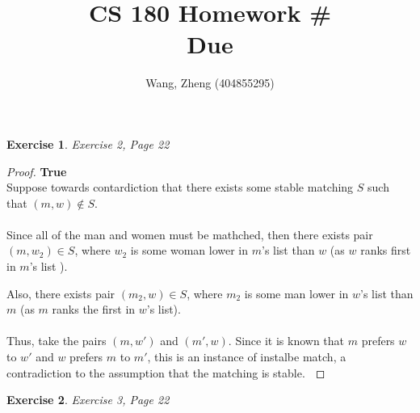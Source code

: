 \documentclass[11pt]{amsart}
\author{Wang, Zheng (404855295)}
\title{CS 180 Homework \#\homeworknumber
\\ Due \duedate}
\theoremstyle{theorem}
\newtheorem{exercise}{Exercise}
\begin{document}
\maketitle
	
\begin{exercise}
Exercise 2, Page 22
\end{exercise}
	
\begin{proof}
\textbf{True}\\

Suppose towards contardiction that there exists some stable matching $ S $ such that $ (m,w) \notin S$.\\\\

Since all of the man and women must be mathched, then there exists pair $ (m, w_2) \in S$, where $ w_2 $ is some woman lower in $ m $'s list than $ w $ (as $ w $ ranks first in $ m $'s list ).

Also, there exists pair $ (m_2, w)  \in S$, where $ m_2 $ is some man lower in $ w $'s list than $ m $ (as $ m $ ranks the first in $ w $'s list).\\\\

Thus, take the pairs $ (m,w') $ and $ (m', w) $. Since it is known that $ m $ prefers $ w $ to $ w'$ and $ w $ prefers $ m $ to $ m' $, this is an instance of instalbe match, a contradiction to the assumption that the matching is stable. $ \qedhere $
\end{proof}
\hfill
\begin{exercise}
Exercise 3, Page 22 
\end{exercise}
\end{document}
